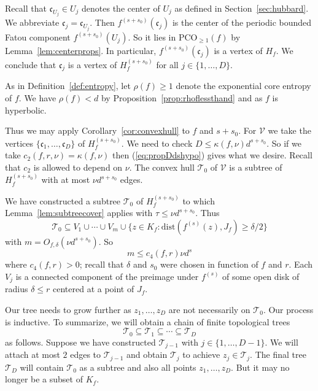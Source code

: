 \documentclass[12pt,oneside,a4]{amsart}
\newcommand{\cV}{\mathcal{V}}
\newcommand{\cT}{\mathcal{T}}
\numberwithin{maincounter}{section}
\numberwithin{equation}{section}
\renewcommand{\subset}{\subseteq}
\newcommand{\pco}{\mathrm{PCO}}
\begin{document}
Recall that $\mathfrak{c}_{U_j}\in U_j$ denotes the center of $U_j$ as
defined in Section~\ref{sec:hubbard}.
We abbreviate $\mathfrak{c}_j = \mathfrak{c}_{U_j}$.
Then $f^{(s+s_0)}(\mathfrak{c}_{j})$ is the center of the periodic
bounded Fatou component
$f^{(s+s_0)}(U_j)$. So it lies in $\pco_{\ge 1}(f)$ by
Lemma~\ref{lem:centerprops}. In particular, $f^{(s+s_0)}(\mathfrak{c}_j)$
is a vertex of $H_f$. We conclude
that $\mathfrak{c}_{j}$ is a vertex of  $H_f^{(s+s_0)}$ for all
$j\in \{1,\ldots,D\}$.



As in Definition~\ref{def:entropy}, let $\rho(f)\ge 1$ denote the
exponential core entropy of $f$. We have $\rho(f)<d$ by
Proposition~\ref{prop:rhoflessthand} and as $f$ is hyperbolic.

Thus we may apply Corollary~\ref{cor:convexhull} to $f$ and $s+s_0$.
For $\cV$ we take the  vertices 
$\{\mathfrak{c}_{1},\ldots,\mathfrak{c}_{D}\}$ of $H_f^{(s+s_0)}$.
We need to check
$D\le \kappa(f,\nu) d^{s+s_0}$.
So if we take $c_2(f,r,\nu) = \kappa(f,\nu)$
then (\ref{eq:propDdshypo}) gives what we desire. Recall that $c_2$ is
allowed to depend on $\nu$. 
The convex hull $\cT_0$ of $\cV$ is a subtree of $H_f^{(s+s_0)}$ with
at most $\nu d^{s+s_0}$ edges.


We have constructed a subtree $\cT_0$ of $H_f^{(s+s_0)}$ to which
Lemma~\ref{lem:subtreecover} applies with $\tau\le \nu d^{s+s_0}$. 
Thus
\begin{equation}
  \label{eq:T0inclusion}
  \cT_0 \subset V_1\cup\cdots\cup V_m \cup \{z\in K_f :
  \mathrm{dist}(f^{(s)}(z),J_f) \ge \delta/2\}
\end{equation}
with $m = O_{f,\delta}(\nu d^{s+s_0})$.
So
\begin{equation}
  \label{eq:mc4nuds}
  m \le c_4(f,r) \nu d^{s} 
\end{equation}
where {$c_4(f,r)>0$};
recall that $\delta$ and $s_0$ were chosen in
function of $f$ and $r$. 
Each $V_j$ is a connected component of the preimage under
$f^{(s)}$ of some open disk of radius $\delta\le r$ centered
at a point of $J_f$. 

Our
tree needs to grow further as
$z_1,\ldots,z_D$ are not necessarily on $\cT_0$.   Our process is inductive.
To summarize, we will obtain a chain of finite topological trees
\begin{equation*}
  \cT_0 \subset \cT_1 \subset \cdots \subset \cT_{D}
\end{equation*}
as follows. 
Suppose we have constructed $\cT_{j-1}$ with $j\in \{1,\ldots,D-1\}$.
We will attach at most $2$ edges to $\cT_{j-1}$ and obtain
$\cT_{j}$ to achieve $z_j\in \cT_j$.
The final tree $\cT_D$ will contain $\cT_0$ as a subtree and also
all points $z_1,\ldots,z_D$.
But it may no longer be a subset of $K_f$. 
\end{document}
